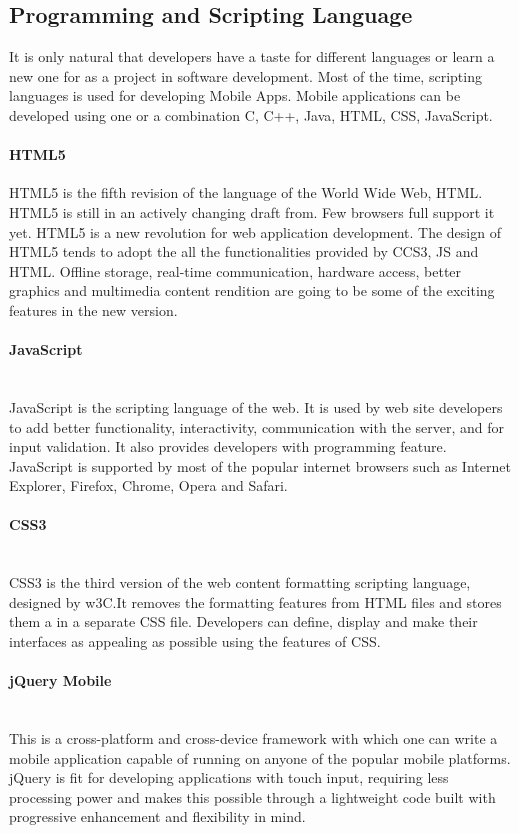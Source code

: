 \subsection{Programming and Scripting Language}
It is only natural that developers have a taste for different languages or
learn a new one for as a project in software development. Most of the time,
scripting languages is used for developing Mobile Apps. Mobile applications
can be developed using one or a combination C, C++, Java, HTML, CSS, JavaScript.
\paragraph{HTML5}

HTML5 is the fifth revision of the language of the World Wide Web, HTML.
 HTML5 is still in an actively changing draft from. Few browsers full
 support it yet. HTML5 is a new revolution for web application development.
 The design of HTML5 tends to adopt the all the functionalities provided
 by CCS3, JS and HTML.  Offline storage, real-time communication, hardware
 access, better graphics and multimedia content rendition are going to be
 some of the exciting features in the new version.

 \paragraph{JavaScript}\\
 JavaScript is the scripting language of the web.
 It is used by web site developers to add better
 functionality, interactivity, communication with the
 server, and for input validation. It also provides developers
 with programming feature. JavaScript is supported by most of
 the popular internet browsers such as Internet Explorer, Firefox,
 Chrome, Opera and Safari.
 \paragraph{CSS3}\\
 CSS3 is the third version of the web content formatting scripting language,
 designed by w3C.It removes the formatting features from HTML files and
 stores them a in a separate CSS file.
Developers can define, display and make their interfaces as appealing
as possible using the features of CSS.
\paragraph{jQuery Mobile}\\
This is a cross-platform and cross-device framework with which one can write
a mobile application capable of running on anyone of the popular mobile platforms.
jQuery is fit for developing applications with touch input, requiring
less processing power and  makes this possible through a lightweight code
built with progressive enhancement and flexibility in mind.


